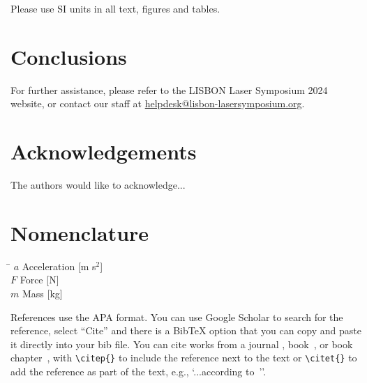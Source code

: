 \documentclass[fleqn]{LxSymp_2024_Paper_Format}
\begin{document}
Please use SI units in all text, figures and tables.

\section{Conclusions}
\label{Sec:Conclusions}

For further assistance, please refer to the LISBON Laser Symposium 2024 website, or contact our staff at \href{mailto:helpdesk@lisbon-lasersymposium.org}{helpdesk@lisbon-lasersymposium.org}.

\section*{Acknowledgements}
The authors would like to acknowledge...

\section*{Nomenclature}
\begin{tabbing}
\hspace*{1.18 cm}  \= \hspace*{4 cm}  \kill
$a$ 	\>	Acceleration [m s$^2$]    \\
$F$		\> 	Force [N]	\\
$m$ 	\> 	Mass [kg]
\end{tabbing}

References use the APA format. You can use Google Scholar to search for the reference, select ``Cite'' and there is a BibTeX option that you can copy and paste it directly into your bib file. You can cite works from a journal \citep{foucaut2004piv}, book~\citep{yarin2017collision}, or book chapter~\citep{armstrong1988laser}, with \verb|\citep{}| to include the reference next to the text or \verb|\citet{}| to add the reference as part of the text, e.g., `...according to~\citet{panao2018spray}''.





\end{document}
